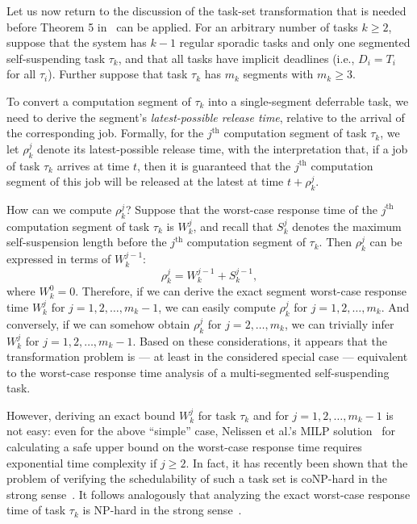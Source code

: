Let us now return to the discussion of the task-set transformation that is needed before Theorem 5 in~\cite{Raj:suspension1991} can be applied. For an arbitrary number of tasks $k \geq 2$, 
suppose that the system has $k-1$ regular sporadic tasks and only one segmented self-suspending task $\tau_k$, and that all tasks have implicit deadlines (i.e., $D_i = T_i$ for all $\tau_i$). Further suppose that task $\tau_k$ has $m_k$ segments with $m_k \geq 3$.  

To  convert a computation segment of $\tau_k$ into a single-segment deferrable task, we need to derive the segment's \emph{latest-possible release time}, relative to the arrival of the corresponding job. Formally,  for the $j^{\mathrm{th}}$ computation segment of task $\tau_k$, we let $\rho_k^j$ denote its latest-possible release time, with the interpretation that, if a job of task $\tau_k$ arrives at time $t$, then  it is guaranteed that the $j^{\mathrm{th}}$ computation segment of this job will be released at the latest at time $t+\rho_k^j$.

How can we compute $\rho_k^j$? Suppose that the worst-case response time of the $j^{\mathrm{th}}$ computation segment of task $\tau_k$ is $W_k^j$, and recall that $S_k^{j}$ denotes the maximum self-suspension length before the $j^{\mathrm{th}}$ computation segment of $\tau_k$. Then $\rho_k^j$ can be expressed in terms of $W_k^{j-1}$:
$$
	\rho_k^j = W_k^{j-1}+S_k^{j-1},
$$
where $W_k^0 = 0$.  Therefore, if we can derive the exact segment worst-case response time $W_k^j$ for $j=1,2,\ldots,m_k-1$, we can easily compute $\rho_k^j$  for $j=1,2,\ldots,m_k$. And conversely, if we can somehow obtain $\rho_k^j$  for $j=2,\ldots,m_k$, we  can trivially infer $W_k^j$ for $j=1,2,\ldots,m_k-1$.
Based on these considerations, it appears that the transformation problem is  --- at least in the considered special case --- equivalent to the  worst-case response time analysis of a multi-segmented self-suspending task. 

However, deriving an exact bound $W_k^j$ for task $\tau_k$ and for $j=1,2,\ldots,m_k-1$ is not easy: 
even for the above ``simple'' case, Nelissen et al.'s MILP solution~\cite{ecrts15nelissen} for calculating a safe upper bound on the worst-case response time requires exponential time complexity if $j \geq 2$. In fact, it has recently been shown that the problem of verifying the schedulability of such a task set is coNP-hard in the strong sense~\cite{RTSS2016-suspension}. It follows analogously that analyzing the exact worst-case response time of task $\tau_k$ is NP-hard in the strong sense~\cite{RTSS2016-suspension}.

